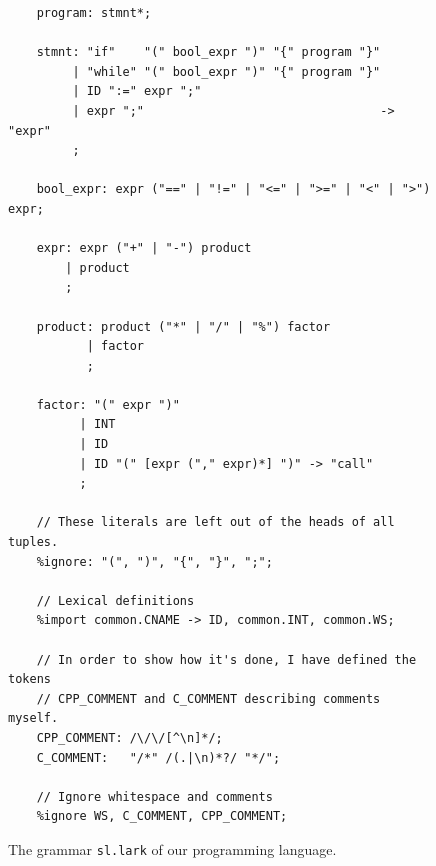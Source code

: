\begin{figure}[!ht]
\centering
\begin{verbatim}
    program: stmnt*;

    stmnt: "if"    "(" bool_expr ")" "{" program "}"
         | "while" "(" bool_expr ")" "{" program "}"
         | ID ":=" expr ";"
         | expr ";"                                 -> "expr"
         ;

    bool_expr: expr ("==" | "!=" | "<=" | ">=" | "<" | ">") expr;

    expr: expr ("+" | "-") product
        | product
        ;

    product: product ("*" | "/" | "%") factor
           | factor
           ;

    factor: "(" expr ")"
          | INT
          | ID
          | ID "(" [expr ("," expr)*] ")" -> "call"
          ;

    // These literals are left out of the heads of all tuples.
    %ignore: "(", ")", "{", "}", ";";

    // Lexical definitions
    %import common.CNAME -> ID, common.INT, common.WS;

    // In order to show how it's done, I have defined the tokens
    // CPP_COMMENT and C_COMMENT describing comments myself.
    CPP_COMMENT: /\/\/[^\n]*/;
    C_COMMENT:   "/*" /(.|\n)*?/ "*/";

    // Ignore whitespace and comments
    %ignore WS, C_COMMENT, CPP_COMMENT;
\end{verbatim}
\vspace*{-0.3cm}
\caption{The grammar \texttt{sl.lark} of our programming language.}
\label{fig:01-Interpreter.ipynb:grammar}
\end{figure}

